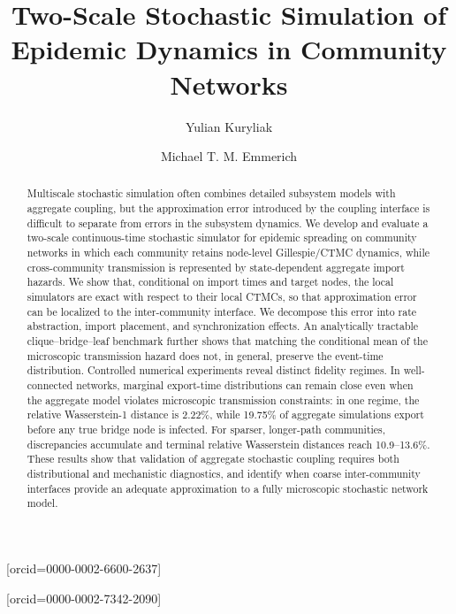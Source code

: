 \documentclass[a4paper,fleqn]{cas-sc}
\begin{document}
\let\WriteBookmarks\relax
\def\floatpagepagefraction{1}
\def\textpagefraction{.001}


\title[mode=title]{Two-Scale Stochastic Simulation of Epidemic Dynamics in Community Networks}

\author[1]{Yulian Kuryliak}[orcid=0000-0002-6600-2637]
\cormark[1]

\author[2]{Michael T. M. Emmerich}[orcid=0000-0002-7342-2090]


\begin{abstract}
Multiscale stochastic simulation often combines detailed subsystem models with aggregate coupling, but the approximation error introduced by the coupling interface is difficult to separate from errors in the subsystem dynamics. We develop and evaluate a two-scale continuous-time stochastic simulator for epidemic spreading on community networks in which each community retains node-level Gillespie/CTMC dynamics, while cross-community transmission is represented by state-dependent aggregate import hazards. We show that, conditional on import times and target nodes, the local simulators are exact with respect to their local CTMCs, so that approximation error can be localized to the inter-community interface. We decompose this error into rate abstraction, import placement, and synchronization effects. An analytically tractable clique–bridge–leaf benchmark further shows that matching the conditional mean of the microscopic transmission hazard does not, in general, preserve the event-time distribution. Controlled numerical experiments reveal distinct fidelity regimes. In well-connected networks, marginal export-time distributions can remain close even when the aggregate model violates microscopic transmission constraints: in one regime, the relative Wasserstein-1 distance is 2.22\%, while 19.75\% of aggregate simulations export before any true bridge node is infected. For sparser, longer-path communities, discrepancies accumulate and terminal relative Wasserstein distances reach 10.9–13.6\%. These results show that validation of aggregate stochastic coupling requires both distributional and mechanistic diagnostics, and identify when coarse inter-community interfaces provide an adequate approximation to a fully microscopic stochastic network model.
\end{abstract}
\end{document}
